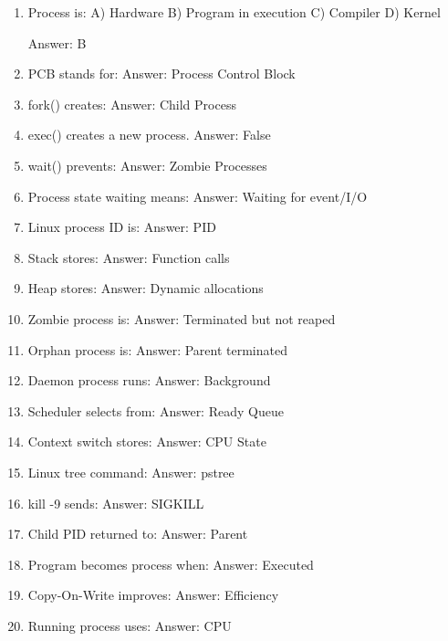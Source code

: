 \begin{enumerate}
\item Process is:
A) Hardware
B) Program in execution
C) Compiler
D) Kernel

Answer: B

\item PCB stands for:
Answer: Process Control Block

\item fork() creates:
Answer: Child Process

\item exec() creates a new process.
Answer: False

\item wait() prevents:
Answer: Zombie Processes

\item Process state waiting means:
Answer: Waiting for event/I/O

\item Linux process ID is:
Answer: PID

\item Stack stores:
Answer: Function calls

\item Heap stores:
Answer: Dynamic allocations

\item Zombie process is:
Answer: Terminated but not reaped

\item Orphan process is:
Answer: Parent terminated

\item Daemon process runs:
Answer: Background

\item Scheduler selects from:
Answer: Ready Queue

\item Context switch stores:
Answer: CPU State

\item Linux tree command:
Answer: pstree

\item kill -9 sends:
Answer: SIGKILL

\item Child PID returned to:
Answer: Parent

\item Program becomes process when:
Answer: Executed

\item Copy-On-Write improves:
Answer: Efficiency

\item Running process uses:
Answer: CPU
\end{enumerate}

